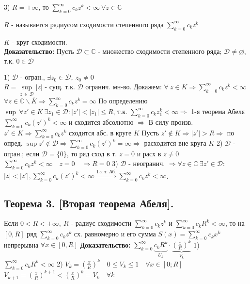 \documentclass[a4paper,12pt]{article} %
\begin{document}
3) $R = +\infty$, то $\sum\limits_{k = 0}^\infty c_k z^k < \infty \  \forall z \in \mathbb{C}$

$R$ - называется радиусом сходимости степенного ряда $\sum\limits_{k = 0}^\infty c_k z^k$

$K$ - круг сходимости.\\
\textbf{Доказательство:} Пусть $\mathscr{D} \subset \mathbb{C}$ - множество сходимости степенного ряда; $\mathscr{D} \neq \varnothing$, т.к. $0 \in \mathscr{D}$

1) $\mathscr{D}$ - огран., $\exists z_0 \in \mathscr{D}, ~z_0 \neq 0$ \\
$R = \underset{z \, \in \, \mathscr{D}}{\sup} |z| $ - сущ. т.к. $\mathscr{D}$ огранич. мн-во.
Докажем: $\forall \  z \in K \Rightarrow  \sum\limits_{k = 0}^\infty c_k z^k < \infty$
$\forall z \in \mathbb{C} \backslash \overline{K} \Rightarrow  \sum\limits_{k = 0}^\infty c_k z^k = \infty$
По определению $\sup \, \forall z'\in K \  \exists z_1 \in \mathscr{D} : |z'| < |z_1| \leqslant R$, т.к.
$ \sum\limits_{k = 0}^\infty c_k z_1^k < \infty \Rightarrow$ 1-я теорема Абеля $ \sum\limits_{k = 0}^\infty c_k (z')^k < \infty$ и сходится абсолютно $\Rightarrow$ В силу произв. $z' \in K \Rightarrow  \sum\limits_{k = 0}^\infty c_k z^k$ сходится абс. в круге $K$
Пусть $z' \notin K \Rightarrow |z'| > R \Rightarrow$ по опред. $\sup z' \notin \mathscr{D} \Rightarrow  \sum\limits_{k = 0}^\infty c_k (z')^k = \infty \Rightarrow$ расходится вне круга $K$
2) $\mathscr{D}$ - огран.;  если $\mathscr{D} = \{0\}$, то ряд сход в т. $z = 0$ и расх в $z \neq 0$
$ \sum\limits_{k = 0}^\infty c_k z^k < \infty \quad z = 0 \quad \Rightarrow R = 0$
3) $\mathscr{D}$ - неогранич. $\Rightarrow \forall z \in \mathbb{C} \  \exists z'  \in \mathscr{D}:$
$|z| < |z'|,  \sum\limits_{k = 0}^\infty c_k (z')^k < \infty \stackrel{\text{1-я т. Аб.}}{\Rightarrow}  \sum\limits_{k = 0}^\infty c_k z^k < \infty$.\\

\subsection{Теорема 3. [Вторая теорема Абеля].}

Если $0<R<+\infty, \  R$ - радиус сходимости $\sum\limits_{k = 0}^\infty c_k z^k$  и $\sum\limits_{k = 0}^\infty c_k R^k < \infty$, то на $[0, R]$ ряд $\sum\limits_{k = 0}^\infty c_k z^k$ сх. равномерно и его сумма $S(x) = \sum\limits_{k = 0}^\infty c_k x^k$ непрерывна $\forall x \in [0, R]$
\textbf{Доказательство:}
$ \sum\limits_{k = 0}^\infty \underbrace{c_k R^k}_{U_k} \cdot \underbrace{\left(\frac{x}{R}\right)^k}_{V_k}$
1) $\sum\limits_{k = 0}^\infty c_k R^k < \infty $
2) $V_k =  \left( \frac{x}{R} \right)^k \quad 0 \leqslant V_k \leqslant 1 \quad \forall x \in [0; R]$
$V_{k + 1} = \left( \frac{x}{R} \right)^{k + 1}  < \left( \frac{x}{R} \right)^k = V_k \quad \forall k$
\end{document}
